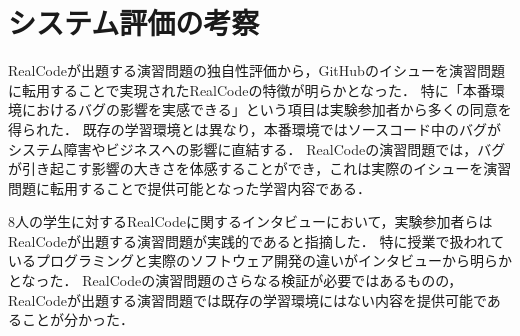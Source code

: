 

\section{システム評価の考察}

RealCodeが出題する演習問題の独自性評価から，GitHubのイシューを演習問題に転用することで実現されたRealCodeの特徴が明らかとなった．
特に「本番環境におけるバグの影響を実感できる」という項目は実験参加者から多くの同意を得られた．
既存の学習環境とは異なり，本番環境ではソースコード中のバグがシステム障害やビジネスへの影響に直結する．
RealCodeの演習問題では，バグが引き起こす影響の大きさを体感することができ，これは実際のイシューを演習問題に転用することで提供可能となった学習内容である．



8人の学生に対するRealCodeに関するインタビューにおいて，実験参加者らはRealCodeが出題する演習問題が実践的であると指摘した．
特に授業で扱われているプログラミングと実際のソフトウェア開発の違いがインタビューから明らかとなった．
RealCodeの演習問題のさらなる検証が必要ではあるものの，RealCodeが出題する演習問題では既存の学習環境にはない内容を提供可能であることが分かった．

